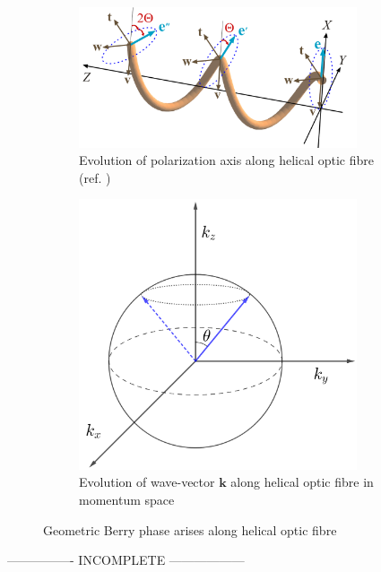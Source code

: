 \documentclass[11pt,a4paper]{article}
\numberwithin{equation}{section}
\begin{document}
\begin{figure}[H]
	\begin{subfigure}[H]{0.62\textwidth}
		\centering
		\includegraphics[width=0.9\textwidth]{berry.png}
		\caption{Evolution of polarization axis along helical optic fibre (ref. \cite{bliokh 09})}
		\label{fig:berry a}
	\end{subfigure}
	\hfil
	\begin{subfigure}[H]{0.35\textwidth}
		\centering
		\includegraphics[width=0.9\textwidth]{poincare-berry.png}
		\caption{Evolution of wave-vector $\boldsymbol{k}$ along helical optic fibre in momentum space}
		\label{fig:berry b}
	\end{subfigure}
	\caption{Geometric Berry phase arises along helical optic fibre}
	
\end{figure}


---------------- INCOMPLETE ------------------
\end{document}
